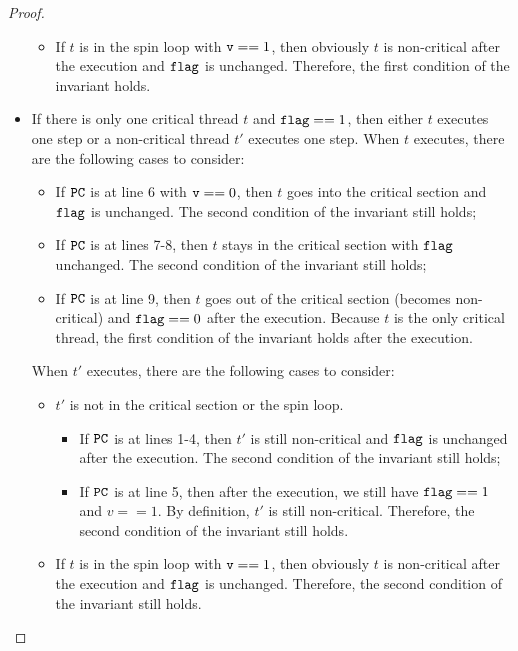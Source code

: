 \documentclass{article}[10pt]
\newcommand{\kwd}[1]{\ensuremath{\text{\ttfamily #1}}\xspace}
\def\kflag{\kwd{flag}}
\def\kv{\kwd{v}}
\begin{document}
\begin{proof}
\begin{itemize}
\begin{itemize}
    \item If $t$ is in the spin loop with $\kv == 1$, then obviously
      $t$ is non-critical after the execution and $\kflag$ is
      unchanged. Therefore, the first condition of the invariant
      holds.

    \end{itemize}
    
  \item If there is only one critical thread $t$ and $\kflag == 1$,
    then either $t$ executes one step or a non-critical thread $t'$
    executes one step. When $t$ executes, there are the following
    cases to consider:
    \begin{itemize}
    \item If \kwd{PC} is at line 6 with $\kv == 0$, then $t$ goes into
      the critical section and \kflag is unchanged. The second
      condition of the invariant still holds;

    \item If \kwd{PC} is at lines 7-8, then $t$ stays in the critical
      section with \kflag unchanged. The second condition of the
      invariant still holds;

    \item If \kwd{PC} is at line 9, then $t$ goes out of the critical
      section (becomes non-critical) and $\kflag == 0$ after
      the execution. Because $t$ is the only critical thread, the first
      condition of the invariant holds after the execution.
    \end{itemize}
    When $t'$ executes, there are the following cases to consider:
    \begin{itemize}
    \item $t'$ is not in the critical section or the spin loop. 
      \begin{itemize}
      \item If \kwd{PC} is at lines 1-4, then $t'$ is still
        non-critical and \kflag is unchanged after the execution. The
        second condition of the invariant still holds;

      \item If \kwd{PC} is at line 5, then after the execution, we
        still have $\kflag == 1$ and $v == 1$. By definition, $t'$ is
        still non-critical. Therefore, the second condition of the
        invariant still holds.

      \end{itemize}

      \item If $t$ is in the spin loop with $\kv == 1$, then obviously
        $t$ is non-critical after the execution and $\kflag$ is
        unchanged. Therefore, the second condition of the invariant
        still holds.
    \end{itemize}
  \end{itemize}
\end{proof}
\end{document}
